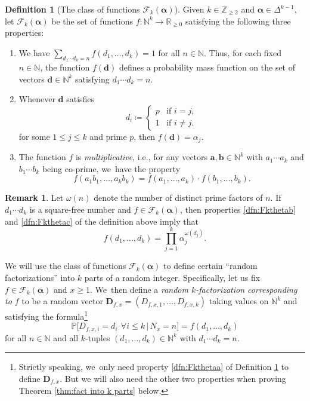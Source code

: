 \documentclass[11pt]{article}
\newcommand{\ie}{i.e.,\xspace}
\newenvironment{enumeratea}
{\bgroup\def\theenumi{\alph{enumi}}\begin{enumerate}}
{\end{enumerate}\egroup}
\newcommand{\ba}{{\boldsymbol a}}
\newcommand{\bb}{{\boldsymbol b}}
\newcommand{\bd}{{\boldsymbol d}}
\newcommand{\bD}{{\boldsymbol D}}
\newcommand{\NN}{\mathbb{N}}
\newcommand{\ZZ}{\mathbb{Z}}
\newcommand{\RR}{\mathbb{R}}
\newcommand{\PP}{\mathbb{P}}
\newcommand{\boldalpha}{\boldsymbol{\alpha}}
\newcommand{\simplex}{\Delta^{k-1}}
\newcommand{\bgg}{\Big}
\theoremstyle{plain}
\theoremstyle{definition}
\newtheorem{deff}[cor]{Definition}
\newtheorem*{rems}{Remark}
\begin{document}
\begin{deff}[The class of functions $\mathcal F_k(\boldalpha)$]\label{dfn:Fktheta}
Given $k\in\ZZ_{\ge2}$ and $\boldalpha\in \simplex$, let $\mathcal F_k(\boldalpha)$ be the set of functions $f \colon \NN^{k} \to \RR_{ \ge 0}$ satisfying the following three properties:
\begin{enumeratea}
\item\label{dfn:Fkthetaa} We have $\sum_{d_1\cdots d_k = n} f(d_1, \ldots, d_k) = 1$ for all $n \in \NN$. Thus, for each fixed $n \in \NN$, the function $f(\bd)$ defines a probability mass function on the set of vectors $\bd \in \NN^k$ satisfying $d_1\cdots d_k = n$.

\item\label{dfn:Fkthetab} Whenever $\bd$ satisfies
\[
d_i \coloneqq \begin{cases}
p &\text{if $i = j$}, \\
1 &\text{if $i \ne j$}.
\end{cases}
\]
for some $1 \le j \le k$ and prime $p$, then $f(\bd) = \alpha_j$.

\item\label{dfn:Fkthetac} The function $f$ is \emph{multiplicative}, \ie for any vectors $\ba, \bb \in \NN^k$ with $a_1\cdots a_k$ and $b_1 \cdots b_k$ being co-prime, we~have the property
\[
f(a_1b_1, \ldots, a_kb_k) = f(a_1, \ldots, a_k) \cdot f(b_1, \ldots, b_k).
\]
\end{enumeratea}
\end{deff}

\begin{rems}
Let $\omega(n)$ denote the number of distinct prime factors of $n$. If~$d_1\cdots d_k$ is a square-free number and $f\in\mathcal{F}_k (\boldalpha)$, then properties \eqref{dfn:Fkthetab} and \eqref{dfn:Fkthetac} of the definition above imply that
\begin{equation}
\label{eq:f on squarefrees}
f(d_1,\dots,d_k) = \prod_{j=1}^k \alpha_j^{\omega(d_j)}.
\end{equation}
\end{rems}

We will use the class of functions $\mathcal{F}_k(\boldalpha)$ to define certain ``random factorizations'' into $k$ parts of a random integer. Specifically, let us fix $f\in\mathcal{F}_k(\boldalpha)$ and $x\ge1$. We~then define a {\it random $k$-factorization corresponding to $f$} to be a random vector $\bD_{f, x}=(D_{f,x,1},\dots,D_{f,x,k})$ taking values on $\NN^k$ and satisfying the formula\footnote{Strictly speaking, we~only need property \eqref{dfn:Fkthetaa} of Definition \ref{dfn:Fktheta} to define $\bD_{f,x}$. But we will also need the other two properties when proving Theorem \ref{thm:fact into k parts} below.}
\begin{equation}
\label{eq:prob mass function f}
\PP\bgg[D_{f,x,i} = d_i \ \, \forall i \le k\, \bgg|\, N_x = n\bgg] = f(d_1, \ldots, d_k)
\end{equation}
for all $n\in\NN$ and all $k$-tuples $(d_1,\dots,d_k)\in\NN^k$ with $d_1\cdots d_k=n$.
\end{document}
